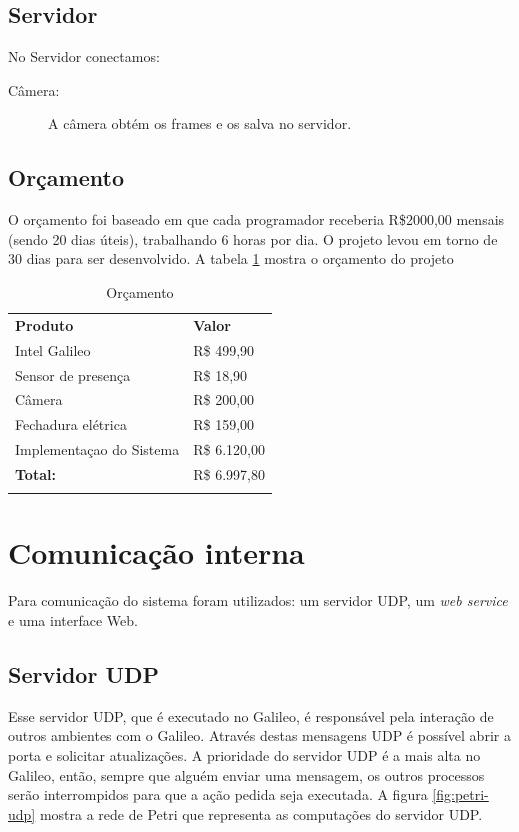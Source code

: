 \documentclass[12pt]{article}
\begin{document}
\subsection{Servidor}
    No Servidor conectamos:
    \begin{description}
        \item[Câmera:] A câmera obtém os frames e os salva no servidor.
    \end{description}

\subsection{Orçamento}
	O orçamento foi baseado em que cada programador receberia R\$2000,00 mensais
	(sendo 20 dias úteis), trabalhando 6 horas por dia. O projeto levou em torno
	de 30 dias para ser desenvolvido. A tabela \ref{orcamento} mostra o orçamento
	do projeto

	\begin{table}[]
	\centering
	\caption{Orçamento}
	\label{orcamento}
	\begin{tabular}{ll}
	\textbf{Produto}         & \textbf{Valor} \\
	Intel Galileo            & R\$ 499,90     \\
	Sensor de presença       & R\$ 18,90      \\
	Câmera                   & R\$ 200,00     \\
	Fechadura elétrica       & R\$ 159,00     \\
	Implementaçao do Sistema & R\$ 6.120,00   \\
	\textbf{Total:}          & R\$ 6.997,80   \\
                         &
	\end{tabular}
	\end{table}		


\section{Comunicação interna}
    Para comunicação do sistema foram utilizados: um servidor UDP, um
    \textit{web service} e uma interface Web.
    
\subsection{Servidor UDP}
    Esse servidor UDP, que é executado no Galileo, é responsável pela interação
    de outros ambientes com o Galileo. Através destas mensagens UDP é possível
    abrir a porta e solicitar atualizações.
    A prioridade do servidor UDP é a mais alta no Galileo, então, sempre que
    alguém enviar uma mensagem, os outros processos serão interrompidos para que
    a ação pedida seja executada. A figura \ref{fig:petri-udp} mostra a rede de
    Petri que representa as computações do servidor UDP.
\end{document}
